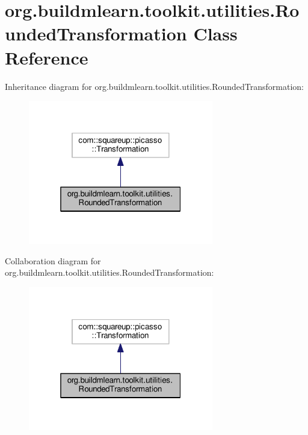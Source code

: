 \hypertarget{classorg_1_1buildmlearn_1_1toolkit_1_1utilities_1_1RoundedTransformation}{}\section{org.\+buildmlearn.\+toolkit.\+utilities.\+Rounded\+Transformation Class Reference}
\label{classorg_1_1buildmlearn_1_1toolkit_1_1utilities_1_1RoundedTransformation}


Inheritance diagram for org.\+buildmlearn.\+toolkit.\+utilities.\+Rounded\+Transformation\+:
\nopagebreak
\begin{figure}[H]
\begin{center}
\leavevmode
\includegraphics[width=229pt]{classorg_1_1buildmlearn_1_1toolkit_1_1utilities_1_1RoundedTransformation__inherit__graph}
\end{center}
\end{figure}


Collaboration diagram for org.\+buildmlearn.\+toolkit.\+utilities.\+Rounded\+Transformation\+:
\nopagebreak
\begin{figure}[H]
\begin{center}
\leavevmode
\includegraphics[width=229pt]{classorg_1_1buildmlearn_1_1toolkit_1_1utilities_1_1RoundedTransformation__coll__graph}
\end{center}
\end{figure}
